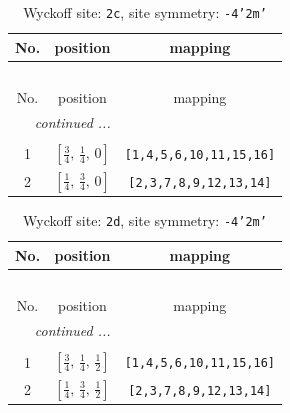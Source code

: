 \documentclass[fleqn,8pt]{jsarticle}
\begin{document}
\renewcommand{\arraystretch}{1.2}
\begin{longtable}{ccc}
\caption{Wyckoff site: {\tt 2c}, site symmetry: {\tt -4'2m'}}
 \\
 \hline \hline
No. & position & mapping \\ \hline \endfirsthead

\multicolumn{2}{l}{\tablename\ \thetable{}} \\
 \hline \hline
No. & position & mapping \\ \hline \endhead

 \hline \hline
\multicolumn{2}{r}{\footnotesize\it continued ...} \\ \endfoot

 \hline \hline
\multicolumn{2}{r}{} \\ \endlastfoot

1 & $\left[ \frac{3}{4},\, \frac{1}{4},\, 0 \right]$ & {\tt [1,4,5,6,10,11,15,16]} \\ \hline
2 & $\left[ \frac{1}{4},\, \frac{3}{4},\, 0 \right]$ & {\tt [2,3,7,8,9,12,13,14]} \\
\end{longtable}
\renewcommand{\arraystretch}{1.2}
\begin{longtable}{ccc}
\caption{Wyckoff site: {\tt 2d}, site symmetry: {\tt -4'2m'}}
 \\
 \hline \hline
No. & position & mapping \\ \hline \endfirsthead

\multicolumn{2}{l}{\tablename\ \thetable{}} \\
 \hline \hline
No. & position & mapping \\ \hline \endhead

 \hline \hline
\multicolumn{2}{r}{\footnotesize\it continued ...} \\ \endfoot

 \hline \hline
\multicolumn{2}{r}{} \\ \endlastfoot

1 & $\left[ \frac{3}{4},\, \frac{1}{4},\, \frac{1}{2} \right]$ & {\tt [1,4,5,6,10,11,15,16]} \\ \hline
2 & $\left[ \frac{1}{4},\, \frac{3}{4},\, \frac{1}{2} \right]$ & {\tt [2,3,7,8,9,12,13,14]} \\
\end{longtable}
\renewcommand{\arraystretch}{1.2}
\end{document}
